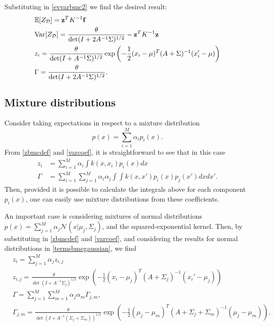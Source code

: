 Substituting in \eqref{evvarbmc2} we find the desired result:
\begin{equation}\label{evvarbmcgaussian}
\begin{split}
& {\mathbb E}[Z_{\mathcal{D}}] = \mathbf{z}^T K^{-1} \mathbf{f} \\
& \mathrm{Var}[Z_{\mathcal{D}}] = \frac{\theta}{\det(I + 2 A^{-1} \Sigma)^{1/2}} - \mathbf{z}^T K^{-1} \mathbf{z} \\
& z_i = \frac{\theta}{\det(I + A^{-1} \Sigma)^{1/2}} \exp \left(-\frac{1}{2}(x_i - \mu)^T (A + \Sigma)^{-1}(x_i' - \mu) \right) \\
& \Gamma = \frac{\theta}{\det(I + 2 A^{-1} \Sigma)^{1/2}}.
\end{split}
\end{equation}

\subsection{Mixture distributions}\label{bmcmixtures}
Consider taking expectations in respect to a mixture distribution
\begin{equation}
 p(x) = \sum_{i=1}^M \alpha_i p_i(x).
\end{equation}
From \eqref{zbmcdef} and \eqref{varcoef}, it is straightforward to see that in this case
\begin{equation}
\begin{split}
 z_i & = \sum_{i=1}^M \alpha_i \int k(x,x_i) p_i(x) dx \\
 \Gamma &= \sum_{i=1}^M \sum_{j=1}^M \alpha_i \alpha_j \int \int k(x,x') p_i(x) p_j(x') dx dx'.
\end{split}
\end{equation}
Then, provided it is possible to calculate the integrals above for each component $p_i(x)$, one can easily use mixture distributions from these coefficients.


An important case is considering mixtures of normal distributions $p(x) = \sum_{j=1}^{M} \alpha_j \mathcal{N}(x|\mu_j,\Sigma_j)$, and the squared-exponential kernel. Then, by substituting in \eqref{zbmcdef} and \eqref{varcoef}, and considering the results for normal distributions in \eqref{termsbmcgaussian}, we find 
\begin{equation}\label{bmcmixgaussians}
\begin{split}
 & z_i = \sum_{j=1}^M \alpha_j z_{i,j} \\ 
 & z_{i,j} = \frac{\theta}{\det(I + A^{-1} \Sigma_j)^{1/2}} \exp \left(-\frac{1}{2}(x_i - \mu_j)^T (A + \Sigma_j)^{-1}(x_i' - \mu_j) \right) \\
 & \Gamma = \sum_{j=1}^M \sum_{m=1}^M \alpha_j \alpha_m \Gamma_{j,m}, \\
 & \Gamma_{j,m} = \frac{\theta}{\det(I + A^{-1} (\Sigma_j+\Sigma_m))^{1/2}} \exp \left(-\frac{1}{2}(\mu_j-\mu_m)^T (A + \Sigma_j + \Sigma_m)^{-1}(\mu_j-\mu_m)\right).
\end{split}
\end{equation}

